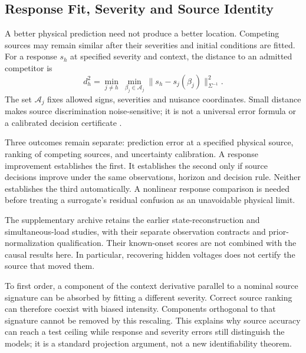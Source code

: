 \subsection{Response Fit, Severity and Source Identity}
\label{sec:narrative-information}

A better physical prediction need not produce a better location. Competing
sources may remain similar after their severities and initial conditions
are fitted. For a response $s_h$ at specified severity and context, the
distance to an admitted competitor is
\begin{equation}
 d_h^2=\min_{j\ne h}\ \min_{\beta_j\in\mathcal A_j}
       \|s_h-s_j(\beta_j)\|_{\Sigma^{-1}}^2.
 \label{eq:narrative-separation}
\end{equation}
The set $\mathcal A_j$ fixes allowed signs, severities and nuisance
coordinates. Small distance makes source discrimination noise-sensitive;
it is not a universal error formula or a calibrated decision certificate
\cite{eriksson2013diagnosability,scharf1994matched}.

Three outcomes remain separate: prediction error at a specified physical
source, ranking of competing sources, and uncertainty calibration. A
response improvement establishes the first. It establishes the second only
if source decisions improve under the same observations, horizon and
decision rule. Neither establishes the third automatically. A nonlinear
response comparison is needed before treating a surrogate's residual
confusion as an unavoidable physical limit.

The supplementary archive retains the earlier state-reconstruction and
simultaneous-load studies, with their separate observation contracts and
prior-normalization qualification. Their known-onset scores are not
combined with the causal results here. In particular, recovering hidden
voltages does not certify the source that moved them.

To first order, a component of the context derivative parallel to a nominal
source signature can be absorbed by fitting a different severity. Correct
source ranking can therefore coexist with biased intensity. Components
orthogonal to that signature cannot be removed by this rescaling. This
explains why source accuracy can reach a test ceiling while response and
severity errors still distinguish the models; it is a standard projection
argument, not a new identifiability theorem.

